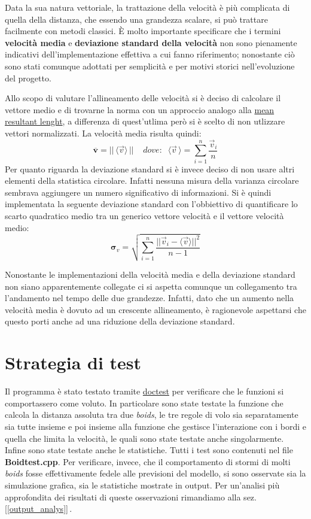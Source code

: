 \documentclass{article}
\begin{document}
Data la sua natura vettoriale, la trattazione della velocità è più complicata di
 quella della distanza, che essendo una grandezza scalare, si può trattare 
 facilmente con metodi classici. È molto importante specificare che i termini 
 \textbf{velocità media} e \textbf{deviazione standard della velocità} non sono 
 pienamente indicativi dell'implementazione effettiva a cui fanno riferimento; 
 nonostante ciò sono stati comunque adottati per semplicità e per motivi storici
  nell'evoluzione del progetto.

Allo scopo di valutare l'allineamento delle velocità si è deciso di calcolare il
 vettore medio e di trovarne la norma con un approccio analogo alla 
 \href{https://en.wikipedia.org/wiki/Circular_mean#:~:text=The%20mean%20resultant%20vector%20for%20the%20sample%20is%20then%3A}
 {mean resultant lenght}, a differenza di quest'utlima però si è scelto di non 
 utlizzare vettori normalizzati. La velocità media risulta quindi:
\[
\mathbf{\overline{v}} = ||\,\langle\vec{v}\rangle\, || \;\;\;\;dove: \;\; \langle\vec{v}\,\rangle = \sum_{i=1}^{n} \frac{\vec{v}_i}{n} 
\]
Per quanto riguarda la deviazione standard si è invece deciso di non usare altri
 elementi della statistica circolare. Infatti nessuna misura della varianza 
 circolare sembrava aggiungere un numero significativo di informazioni. Si è 
 quindi implementata la seguente deviazione standard con l'obbiettivo di 
 quantificare lo scarto quadratico medio tra un generico vettore velocità e il 
 vettore velocità medio:
\bigskip\smallskip
\[
\mathbf{\sigma}_v = \sqrt{\sum_{i=1}^{n} \frac{|| \vec{v}_i - \langle\vec{v}\rangle ||^2 }{n-1}}
\]
\smallskip

Nonostante le implementazioni della velocità media e della deviazione standard 
non siano apparentemente collegate ci si aspetta comunque un collegamento tra 
l'andamento nel tempo delle due grandezze. Infatti, dato che un aumento nella 
velocità media è dovuto ad un crescente allineamento, è ragionevole aspettarsi 
che questo porti anche ad una riduzione della deviazione standard.

\section{Strategia di test}
Il programma è stato testato tramite 
\href{https://github.com/Michelefolli/Progettopaxxo/blob/timestamps_v1/Source/doctest.h}
{doctest} per verificare che le funzioni si comportassero come voluto. 
In particolare sono state testate la funzione che calcola la distanza assoluta 
tra due \textit{boids}, le tre regole di volo sia separatamente sia tutte 
insieme e poi insieme alla funzione che gestisce l'interazione con i bordi e 
quella che limita la velocità, le quali sono state testate anche singolarmente. 
Infine sono state testate anche le statistiche. Tutti i test sono contenuti nel 
file \textbf{Boidtest.cpp}.  Per verificare, invece, che il comportamento di 
stormi di molti \textit{boids}  fosse effettivamente fedele alle previsioni del 
modello, si sono osservate sia la simulazione grafica, sia le statistiche 
mostrate in output. Per un'analisi più approfondita dei risultati di queste 
osservazioni rimandiamo alla sez.[\ref{output_analys}]\,.
\end{document}
